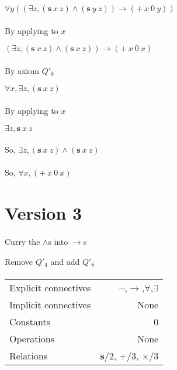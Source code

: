 \documentclass{article}
\begin{document}
$\forall y ((\exists z, (\mathbf{s}\ x\ z) \land (\mathbf{s}\ y\ z)) \rightarrow (+\ x\ 0\ y))$

\paragraph{}
By applying to $x$

$(\exists z, (\mathbf{s}\ x\ z) \land (\mathbf{s}\ x\ z)) \rightarrow (+\ x\ 0\ x)$

\paragraph{}
By axiom $Q'_{8}$

$\forall x, \exists z, (\mathbf{s}\ x \ z)$

\paragraph{}
By applying to $x$

$\exists z, \mathbf{s}\ x\ z$

\paragraph{}
So, $\exists z, (\mathbf{s}\ x \ z) \land (\mathbf{s}\ x\ z)$
 
\paragraph{}
So, $\forall x, (+\ x\ 0\ x)$ 

\newpage
\section{Version 3}
\paragraph{}
Curry the $\land$s into $\rightarrow$s

Remove $Q'_{4}$ and add $Q'_{8}$

\paragraph{}

\begin{tabular}{l | r}
 \hline
 Explicit connectives & $\neg$,$\rightarrow $,$\forall$,$\exists$ \\
 Implicit connectives & None \\
 Constants & 0 \\
 Operations & None \\
 Relations & $\mathbf{s}$/2, $+$/3, $\times$/3\\
 \hline
\end{tabular}
\end{document}
